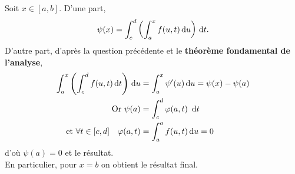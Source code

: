 \begin{preuve}
\begin{enumerate}
        Soit $x \in [a, b]$. D'une part,
        $$\psi(x) = \int_{c}^{d} \left ( \int_{a}^{x} f(u,t) \, \mathrm{d} u \right) \, \mathrm{d} t.$$
        D'autre part, d'après la question précédente et le \textbf{théorème fondamental de l'analyse}, 
        \begin{align*}
            \int_{a}^{x} \left ( \int_{c}^{d} f(u,t) \, \mathrm{d} t \right) \, \mathrm{d} u &= \int_{a}^{x} \psi'(u) \, \mathrm{d} u  = \psi(x) - \psi(a) \\
            \text{Or } \psi(a) &= \int_{c}^{d} \varphi(a, t)\ \, \mathrm{d} t \\
            \text{et } \forall t \in [c, d] \quad \varphi(a, t) &= \int_{a}^{a} f(u, t) \, \mathrm{d} u = 0
        \end{align*}
        d'où $\psi(a) = 0$ et le résultat. \\
        En particulier, pour $x = b$ on obtient le résultat final.
    \end{enumerate}
\end{preuve}    
